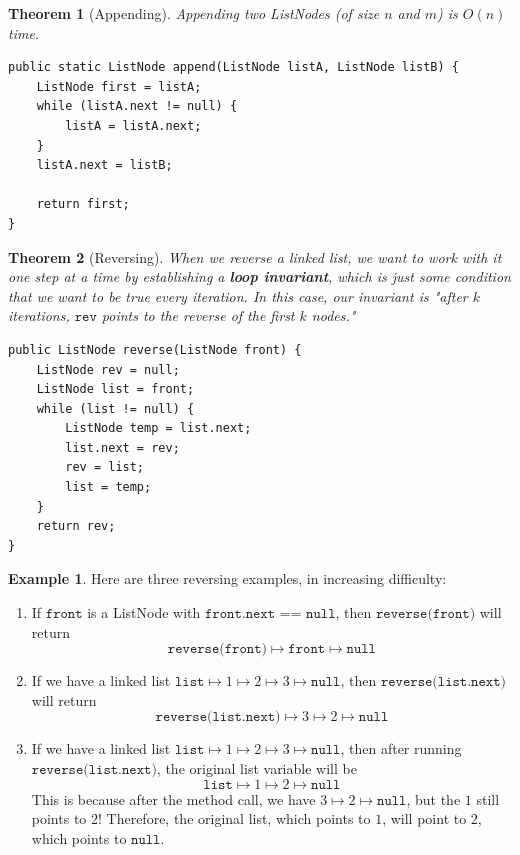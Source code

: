 \documentclass{article}
\newtheorem{theorem}{Theorem}[section]
\theoremstyle{definition}
\newtheorem{example}{Example}[section]
\theoremstyle{remark}
\theoremstyle{definition}
\begin{document}
\begin{theorem}[Appending]
Appending two ListNodes (of size $n$ and $m$) is $O(n)$ time.
\begin{verbatim}
public static ListNode append(ListNode listA, ListNode listB) {
    ListNode first = listA; 
    while (listA.next != null) {
        listA = listA.next; 
    }
    listA.next = listB; 
    
    return first; 
}
\end{verbatim}
\end{theorem}

\begin{theorem}[Reversing]
When we reverse a linked list, we want to work with it one step at a time by establishing a \textbf{loop invariant}, which is just some condition that we want to be true every iteration. In this case, our invariant is "after $k$ iterations, $\texttt{rev}$ points to the reverse of the first $k$ nodes." 
\begin{verbatim}
public ListNode reverse(ListNode front) {
    ListNode rev = null; 
    ListNode list = front; 
    while (list != null) {
        ListNode temp = list.next; 
        list.next = rev; 
        rev = list; 
        list = temp; 
    }
    return rev; 
}
\end{verbatim}
\end{theorem}

\begin{example}
Here are three reversing examples, in increasing difficulty: 
\begin{enumerate}
    \item If $\texttt{front}$ is a ListNode with $\texttt{front.next == null}$, then $\texttt{reverse(front)}$ will return 
    \[\texttt{reverse(front)} \mapsto \texttt{front} \mapsto \texttt{null}\]
    \item If we have a linked list $\texttt{list} \mapsto 1 \mapsto 2 \mapsto 3 \mapsto \texttt{null}$, then $\texttt{reverse(list.next)}$ will return 
    \[\texttt{reverse(list.next)} \mapsto 3 \mapsto 2 \mapsto \texttt{null} \]
    \item If we have a linked list $\texttt{list} \mapsto 1 \mapsto 2 \mapsto 3 \mapsto \texttt{null}$, then after running $\texttt{reverse(list.next)}$, the original list variable will be 
    \[\texttt{list} \mapsto 1 \mapsto 2 \mapsto \texttt{null}\]
    This is because after the method call, we have $3 \mapsto 2 \mapsto \texttt{null}$, but the $1$ still points to $2$! Therefore, the original list, which points to $1$, will point to $2$, which points to $\texttt{null}$. 
\end{enumerate}
\end{example}
\end{document}
